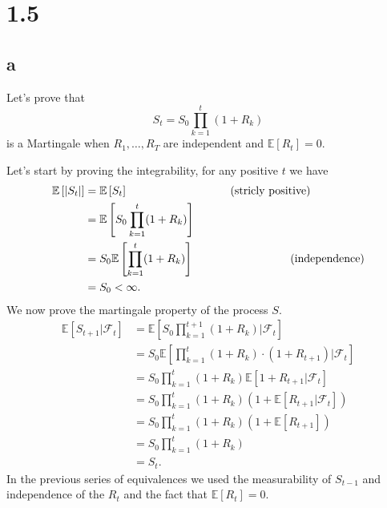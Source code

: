 \documentclass{article}
\newcommand{\comment}[1]{%
  \text{\phantom{(#1)}} \tag{#1}
}
\begin{document}
\section{1.5}
\subsection{a}
Let's prove that
\begin{equation}
  S_t = S_0 \prod_{k=1} ^t (1+R_k)
\end{equation}
is a Martingale when \(R_1,\dots ,R_T\) are independent and \(\mathbb{E} \left[ R_t \right]= 0 \).

Let's start by proving the integrability, for any positive \(t\) we have
\begin{align*}
  \mathbb{E} \left[ |S_t| \right] & = \mathbb{E} \left[ S_t \right] \comment{stricly positive}                    \\
                                  & = \mathbb{E} \left[ S_0 \prod_{k=1} ^t (1+R_k) \right]                        \\
                                  & = S_0\mathbb{E} \left[  \prod_{k=1} ^t (1+R_k) \right] \comment{independence} \\
                                  & = S_0 < \infty.
\end{align*}
We now prove the martingale property of the process \(S\).
\begin{align*}
  \mathbb{E} \left[ S_{t+1}| \mathcal{F}_t \right] & = \mathbb{E} \left[ S_0 \prod_{k=1}^{t+1}(1+R_k)| \mathcal{F}_t   \right]                         \\
                                                   & =S_0 \mathbb{E} \left[ \prod_{k=1}^t (1+R_k) \cdot (1+R_{t+1} ) |\mathcal{F}_t\right]             \\
                                                   & = S_0 \prod_{k=1} ^t (1+R_k) \mathbb{E} \left[ 1+R_{t+1} |\mathcal{F}_t  \right]                  \\
                                                   & = S_0 \prod_{k=1} ^t (1+R_k)  \left( 1+ \mathbb{E} \left[ R_{t+1} | \mathcal{F}_t \right] \right) \\
                                                   & = S_0 \prod_{k=1} ^t (1+R_k)  \left( 1+ \mathbb{E} \left[ R_{t+1} \right] \right)                 \\
                                                   & = S_0 \prod_{k=1} ^t (1+R_k)                                                                      \\
                                                   & = S_t.
\end{align*}
In the previous series of equivalences we used the measurability of \(S_{t-1}\) and independence of the \(R_t\) and the fact that \(\mathbb{E} \left[ R_t \right] = 0\).
\end{document}
